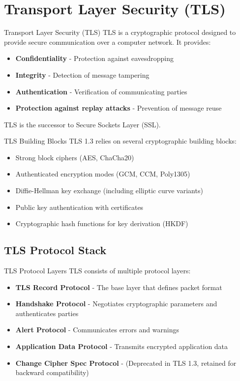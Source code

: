 \section{Transport Layer Security (TLS)}


\begin{definition}{Transport Layer Security (TLS)}
TLS is a cryptographic protocol designed to provide secure communication over a computer network. It provides:
\begin{itemize}
    \item \textbf{Confidentiality} - Protection against eavesdropping
    \item \textbf{Integrity} - Detection of message tampering
    \item \textbf{Authentication} - Verification of communicating parties
    \item \textbf{Protection against replay attacks} - Prevention of message reuse
\end{itemize}
TLS is the successor to Secure Sockets Layer (SSL).
\end{definition}


\begin{concept}{TLS Building Blocks}
TLS 1.3 relies on several cryptographic building blocks:
\begin{itemize}
    \item Strong block ciphers (AES, ChaCha20)
    \item Authenticated encryption modes (GCM, CCM, Poly1305)
    \item Diffie-Hellman key exchange (including elliptic curve variants)
    \item Public key authentication with certificates
    \item Cryptographic hash functions for key derivation (HKDF)
\end{itemize}
\end{concept}

\multend

\subsection{TLS Protocol Stack}


\begin{concept}{TLS Protocol Layers}
TLS consists of multiple protocol layers:
\begin{itemize}
    \item \textbf{TLS Record Protocol} - The base layer that defines packet format
    \item \textbf{Handshake Protocol} - Negotiates cryptographic parameters and authenticates parties
    \item \textbf{Alert Protocol} - Communicates errors and warnings
    \item \textbf{Application Data Protocol} - Transmits encrypted application data
    \item \textbf{Change Cipher Spec Protocol} - (Deprecated in TLS 1.3, retained for backward compatibility)
\end{itemize}
\end{concept}

